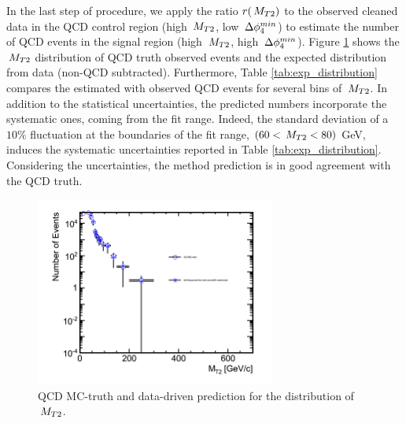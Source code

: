 In the last step of procedure, we apply the ratio $r(\,{M_{T2}})$ 
to the observed cleaned data in the QCD control region (high $\,{M_{T2}}$, 
low $\,{\Delta\phi_{4}^{min}}$) to estimate the number of QCD events in the signal region 
(high $\,{M_{T2}}$, high $\,{\Delta\phi_{4}^{min}}$). Figure \ref{fig:exp_distribution} shows 
the $\,{M_{T2}}$ distribution of QCD truth observed events and 
the expected distribution from data (non-QCD subtracted). 
Furthermore, Table \ref{tab:exp_distribution} compares
the estimated with observed QCD events for several bins of $\,{M_{T2}}$.
In addition to the statistical uncertainties, the predicted numbers incorporate the systematic ones, coming from
the fit range. Indeed, the standard deviation of a $10\%$ fluctuation at the boundaries of the fit range, $(60 < \,{M_{T2}} < 80)$ GeV, 
induces the systematic uncertainties reported in Table \ref{tab:exp_distribution}. 
Considering the uncertainties, the method prediction is in good agreement with the QCD truth. 
 
\begin{linenomath}
\begin{figure}
\centering
\includegraphics[width=0.7\textwidth,keepaspectratio=true]{QCDFig/exp_distribution.png}
\caption{QCD MC-truth and data-driven prediction for the distribution of $\,{M_{T2}}$.}
\label{fig:exp_distribution}
\end{figure}
\end{linenomath}

